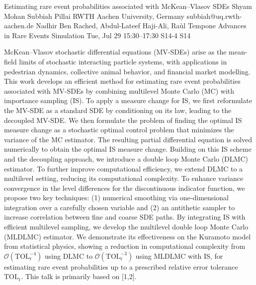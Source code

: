 \begin{talk}
  {Estimating rare event probabilities associated with McKean--Vlasov SDEs}%
  {Shyam Mohan Subbiah Pillai}%
  {RWTH Aachen University, Germany}%
  {subbiah@uq.rwth-aachen.de}%
  {Nadhir Ben Rached, Abdul-Lateef Haji-Ali, Raùl Tempone}%
  {Advances in Rare Events Simulation}%
  {Tue, Jul 29 15:30–17:30}%
  {S14-4}%
  {S14}%
				
			
McKean–Vlasov stochastic differential equations (MV-SDEs) arise as the mean-field limits of stochastic interacting particle systems, with applications in pedestrian dynamics, collective animal behavior, and financial market modelling. This work develops an efficient method for estimating rare event probabilities associated with MV-SDEs by combining multilevel Monte Carlo (MC) with importance sampling (IS). To apply a measure change for IS, we first reformulate the MV-SDE as a standard SDE by conditioning on its law, leading to the decoupled MV-SDE. We then formulate the problem of finding the optimal IS measure change as a stochastic optimal control problem that minimizes the variance of the MC estimator. The resulting partial differential equation is solved numerically to obtain the optimal IS measure change. Building on this IS scheme and the decoupling approach, we introduce a double loop Monte Carlo (DLMC) estimator. To further improve computational efficiency, we extend DLMC to a multilevel setting, reducing its computational complexity. To enhance variance convergence in the level differences for the discontinuous indicator function, we propose two key techniques: (1) numerical smoothing via one-dimensional integration over a carefully chosen variable and (2) an antithetic sampler to increase correlation between fine and coarse SDE paths. By integrating IS with efficient multilevel sampling, we develop the multilevel double loop Monte Carlo (MLDLMC) estimator. We demonstrate its effectiveness on the Kuramoto model from statistical physics, showing a reduction in computational complexity from $\mathcal{O}(\mathrm{TOL}_\mathrm{r}^{-4})$ using DLMC to $\mathcal{O}(\mathrm{TOL}_\mathrm{r}^{-3})$ using MLDLMC with IS, for estimating rare event probabilities up to a prescribed relative error tolerance $\mathrm{TOL}_\mathrm{r}$. This talk is primarily based on [1,2].

\medskip


\end{talk}

